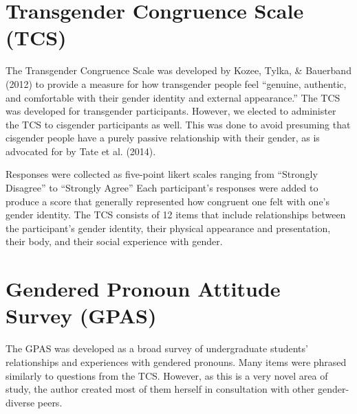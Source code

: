 \documentclass[12pt,twoside]{reedthesis}
\begin{document}
\hypertarget{transgender-congruence-scale-tcs}{%
\section{Transgender Congruence Scale (TCS)}\label{transgender-congruence-scale-tcs}}

The Transgender Congruence Scale was developed by Kozee, Tylka, \& Bauerband (2012) to provide a measure for how transgender people feel ``genuine, authentic, and comfortable with their gender identity and external appearance.'' The TCS was developed for transgender participants. However, we elected to administer the TCS to cisgender participants as well. This was done to avoid presuming that cisgender people have a purely passive relationship with their gender, as is advocated for by Tate et al. (2014).

Responses were collected as five-point likert scales ranging from ``Strongly Disagree'' to ``Strongly Agree'' Each participant's responses were added to produce a score that generally represented how congruent one felt with one's gender identity. The TCS consists of 12 items that include relationships between the participant's gender identity, their physical appearance and presentation, their body, and their social experience with gender.

\hypertarget{gendered-pronoun-attitude-survey-gpas}{%
\section{Gendered Pronoun Attitude Survey (GPAS)}\label{gendered-pronoun-attitude-survey-gpas}}

The GPAS was developed as a broad survey of undergraduate students' relationships and experiences with gendered pronouns. Many items were phrased similarly to questions from the TCS. However, as this is a very novel area of study, the author created most of them herself in consultation with other gender-diverse peers.
\end{document}
